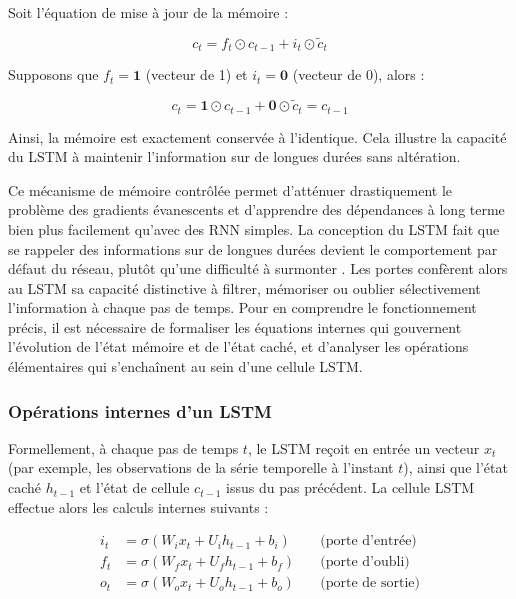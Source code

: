 \begin{demonstration}
Soit l’équation de mise à jour de la mémoire :

\[
c_t = f_t \odot c_{t-1} + i_t \odot \tilde{c}_t
\]

Supposons que $f_t = \mathbf{1}$ (vecteur de 1) et $i_t = \mathbf{0}$ (vecteur de 0), alors :

\[
c_t = \mathbf{1} \odot c_{t-1} + \mathbf{0} \odot \tilde{c}_t = c_{t-1}
\]

Ainsi, la mémoire est exactement conservée à l’identique. Cela illustre la capacité du LSTM à maintenir l’information sur de longues durées sans altération.
\end{demonstration}

Ce mécanisme de mémoire contrôlée permet d’atténuer drastiquement le problème des gradients évanescents et d’apprendre des dépendances à long terme bien plus facilement qu’avec des RNN simples. La conception du LSTM fait que se rappeler des informations sur de longues durées devient le comportement par défaut du réseau, plutôt qu’une difficulté à surmonter \citep{colah2015lstm}. Les portes confèrent alors au LSTM sa capacité distinctive à filtrer, mémoriser ou oublier sélectivement l’information à chaque pas de temps. Pour en comprendre le fonctionnement précis, il est nécessaire de formaliser les équations internes qui gouvernent l’évolution de l’état mémoire et de l’état caché, et d’analyser les opérations élémentaires qui s’enchaînent au sein d’une cellule LSTM.

\subsubsection{Opérations internes d'un LSTM}

Formellement, à chaque pas de temps $t$, le LSTM reçoit en entrée un vecteur $x_t$ (par exemple, les observations de la série temporelle à l’instant $t$), ainsi que l’état caché $h_{t-1}$ et l’état de cellule $c_{t-1}$ issus du pas précédent. La cellule LSTM effectue alors les calculs internes suivants :

\begin{align*}
i_t &= \sigma\left(W_i x_t + U_i h_{t-1} + b_i\right) \quad &\text{(porte d’entrée)}\\
f_t &= \sigma\left(W_f x_t + U_f h_{t-1} + b_f\right) \quad &\text{(porte d’oubli)}\\
o_t &= \sigma\left(W_o x_t + U_o h_{t-1} + b_o\right) \quad &\text{(porte de sortie)}
\end{align*}

